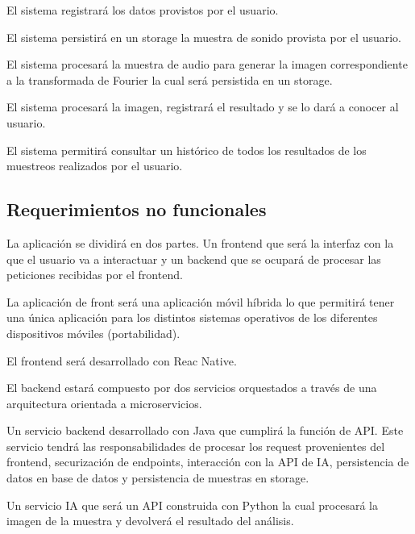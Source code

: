\documentclass[journal]{IEEEtran}
\begin{document}
El sistema registrará los datos provistos por el usuario.

El sistema persistirá en un storage la muestra de sonido provista por el usuario.

El sistema procesará la muestra de audio para generar la imagen correspondiente a la transformada de Fourier la cual será persistida en un storage.

El sistema procesará la imagen, registrará el resultado y se lo dará a conocer al usuario.

El sistema permitirá consultar un histórico de todos los resultados de los muestreos realizados por el usuario.

\subsection{Requerimientos no funcionales}
La aplicación se dividirá en dos partes. Un frontend que será la interfaz con la que el usuario va a interactuar y un backend que se ocupará de procesar las peticiones recibidas por el frontend.

La aplicación de front será una aplicación móvil híbrida lo que permitirá tener una única aplicación para los distintos sistemas operativos de los diferentes dispositivos móviles (portabilidad).

El frontend será desarrollado con Reac Native\cite{react}.

El backend estará compuesto por dos servicios orquestados a través de una arquitectura orientada a microservicios.

Un servicio backend desarrollado con Java que cumplirá la función de API. Este servicio tendrá las responsabilidades de procesar los request provenientes del frontend, securización de endpoints, interacción con la API de IA, persistencia de datos en base de datos y persistencia de muestras en storage\cite{java}.

Un servicio IA que será un API construida con Python la cual procesará la imagen de la muestra y devolverá el resultado del análisis.
\end{document}
